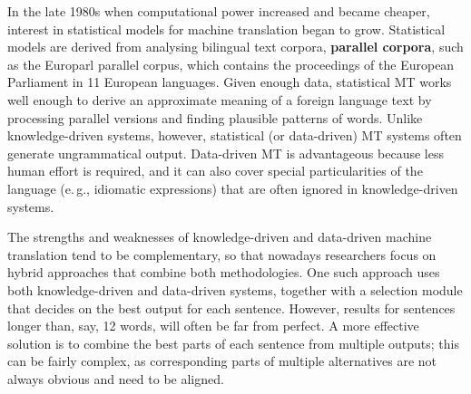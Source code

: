 \documentclass[]{../../metanetpaper}
\begin{document}
\begin{multicols}{2}
In the late 1980s when computational power increased and became cheaper, interest in statistical models for machine translation began to grow. Statistical models are derived from analysing bilingual text corpora, \textbf{parallel corpora}, such as the Europarl parallel corpus, which contains the proceedings of the European Parliament in 11 European languages. Given enough data, statistical MT works well enough to derive an approximate meaning of a foreign language text by processing parallel versions and finding plausible patterns of words. Unlike knowledge-driven systems, however, statistical (or data-driven) MT systems often generate ungrammatical output. Data-driven MT is advantageous because less human effort is required, and it can also cover special particularities of the language (e.\,g., idiomatic expressions) that are often ignored in knowledge-driven systems. 


The strengths and weaknesses of knowledge-driven and data-driven machine translation tend to be complementary, so that nowadays researchers focus on hybrid approaches that combine both methodologies. One such approach uses both knowledge-driven and data-driven systems, together with a selection module that decides on the best output for each sentence. However, results for sentences longer than, say, 12 words, will often be far from perfect. A more effective solution is to combine the best parts of each sentence from multiple outputs; this can be fairly complex, as corresponding parts of multiple alternatives are not always obvious and need to be aligned. 


\end{multicols}
\end{document}
